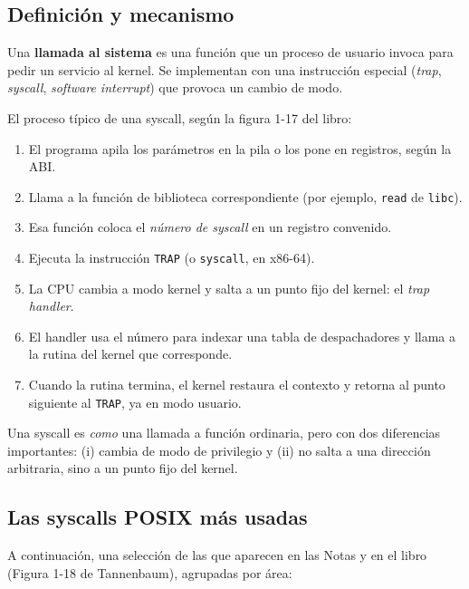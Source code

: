 \documentclass[11pt,a4paper]{article}
\begin{document}
\subsection{Definición y mecanismo}

\begin{definicion}
Una \textbf{llamada al sistema} es una función que un proceso de
usuario invoca para pedir un servicio al kernel. Se implementan con
una instrucción especial (\emph{trap}, \emph{syscall},
\emph{software interrupt}) que provoca un cambio de modo.
\end{definicion}

El proceso típico de una syscall, según la figura 1-17 del libro:

\begin{enumerate}[leftmargin=*]
    \item El programa apila los parámetros en la pila o los pone en
        registros, según la ABI.
    \item Llama a la función de biblioteca correspondiente (por
        ejemplo, \texttt{read} de \texttt{libc}).
    \item Esa función coloca el \emph{número de syscall} en un
        registro convenido.
    \item Ejecuta la instrucción \texttt{TRAP} (o \texttt{syscall}, en
        x86-64).
    \item La CPU cambia a modo kernel y salta a un punto fijo del
        kernel: el \emph{trap handler}.
    \item El handler usa el número para indexar una tabla de
        despachadores y llama a la rutina del kernel que corresponde.
    \item Cuando la rutina termina, el kernel restaura el contexto y
        retorna al punto siguiente al \texttt{TRAP}, ya en modo
        usuario.
\end{enumerate}

\begin{idea}
Una syscall es \emph{como} una llamada a función ordinaria, pero con
dos diferencias importantes: (i) cambia de modo de privilegio y (ii) no
salta a una dirección arbitraria, sino a un punto fijo del kernel.
\end{idea}

\subsection{Las syscalls POSIX más usadas}

A continuación, una selección de las que aparecen en las Notas y en el
libro (Figura 1-18 de Tannenbaum), agrupadas por área:
\end{document}

